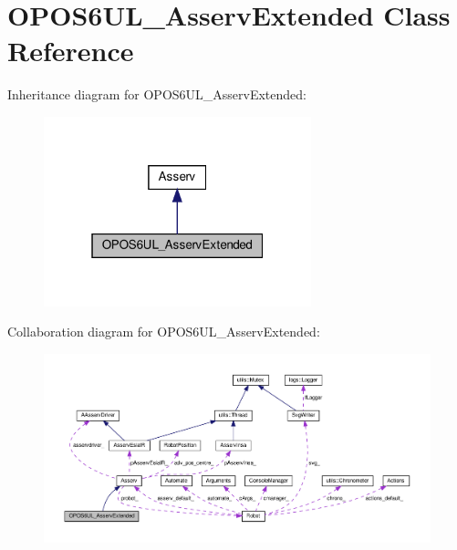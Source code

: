 \hypertarget{classOPOS6UL__AsservExtended}{}\section{O\+P\+O\+S6\+U\+L\+\_\+\+Asserv\+Extended Class Reference}
\label{classOPOS6UL__AsservExtended}


Inheritance diagram for O\+P\+O\+S6\+U\+L\+\_\+\+Asserv\+Extended\+:
\nopagebreak
\begin{figure}[H]
\begin{center}
\leavevmode
\includegraphics[width=220pt]{classOPOS6UL__AsservExtended__inherit__graph}
\end{center}
\end{figure}


Collaboration diagram for O\+P\+O\+S6\+U\+L\+\_\+\+Asserv\+Extended\+:
\nopagebreak
\begin{figure}[H]
\begin{center}
\leavevmode
\includegraphics[width=350pt]{classOPOS6UL__AsservExtended__coll__graph}
\end{center}
\end{figure}
